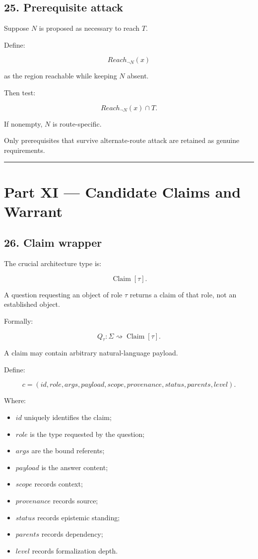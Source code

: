 \documentclass[
]{article}
\providecommand{\tightlist}{%
  \setlength{\itemsep}{0pt}\setlength{\parskip}{0pt}}
\begin{document}
\subsection{25. Prerequisite attack}\label{prerequisite-attack}

Suppose \(N\) is proposed as necessary to reach \(T\).

Define:

\[
Reach_{\neg N}(x)
\]

as the region reachable while keeping \(N\) absent.

Then test:

\[
\boxed{
Reach_{\neg N}(x)\cap T.
}
\]

If nonempty, \(N\) is route-specific.

Only prerequisites that survive alternate-route attack are retained as
genuine requirements.

\begin{center}\rule{0.5\linewidth}{0.5pt}\end{center}

\section{Part XI --- Candidate Claims and
Warrant}\label{part-xi-candidate-claims-and-warrant}

\subsection{26. Claim wrapper}\label{claim-wrapper}

The crucial architecture type is:

\[
\boxed{
\operatorname{Claim}[\tau].
}
\]

A question requesting an object of role \(\tau\) returns a claim of that
role, not an established object.

Formally:

\[
\boxed{
Q_\tau
:
\Sigma
\rightsquigarrow
\operatorname{Claim}[\tau].
}
\]

A claim may contain arbitrary natural-language payload.

Define:

\[
\boxed{
c=
(
id,
role,
args,
payload,
scope,
provenance,
status,
parents,
level
).
}
\]

Where:

\begin{itemize}
\tightlist
\item
  \(id\) uniquely identifies the claim;
\item
  \(role\) is the type requested by the question;
\item
  \(args\) are the bound referents;
\item
  \(payload\) is the answer content;
\item
  \(scope\) records context;
\item
  \(provenance\) records source;
\item
  \(status\) records epistemic standing;
\item
  \(parents\) records dependency;
\item
  \(level\) records formalization depth.
\end{itemize}
\end{document}
